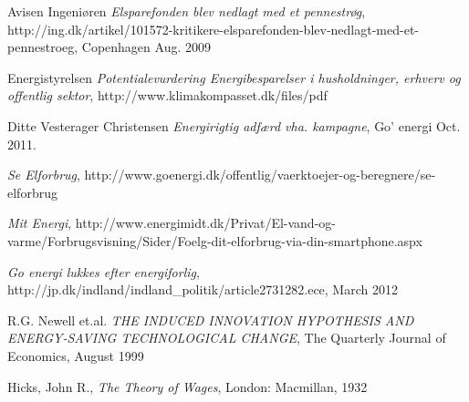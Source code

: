 \documentclass[journal]{IEEEtran}
\begin{document}
\begin{thebibliography}{1}
Avisen Ingeniøren \emph{Elsparefonden blev nedlagt med et pennestrøg}, \relax 
http://ing.dk/artikel/101572-kritikere-elsparefonden-blev-nedlagt-med-et-pennestroeg, Copenhagen Aug. 2009

Energistyrelsen \emph{Potentialevurdering Energibesparelser i husholdninger, erhverv og offentlig sektor}, \relax http://www.klimakompasset.dk/files/pdf


Ditte Vesterager Christensen \emph{Energirigtig adfærd vha. kampagne}, \relax Go' energi Oct. 2011.

\emph{Se Elforbrug}, \relax http://www.goenergi.dk/offentlig/vaerktoejer-og-beregnere/se-elforbrug

\emph{Mit Energi}, \relax 
http://www.energimidt.dk/Privat/El-vand-og-varme/Forbrugsvisning/Sider/Foelg-dit-elforbrug-via-din-smartphone.aspx 

\emph{Go energi lukkes efter energiforlig}, \relax
http://jp.dk/indland/indland\_politik/article2731282.ece, March 2012

R.G. Newell et.al. \emph{THE INDUCED INNOVATION HYPOTHESIS AND ENERGY-SAVING TECHNOLOGICAL CHANGE}, \relax The Quarterly Journal of Economics, August 1999


Hicks, John R., \emph{The Theory of Wages}, \relax London: Macmillan, 1932

\end{thebibliography}




\end{document}
